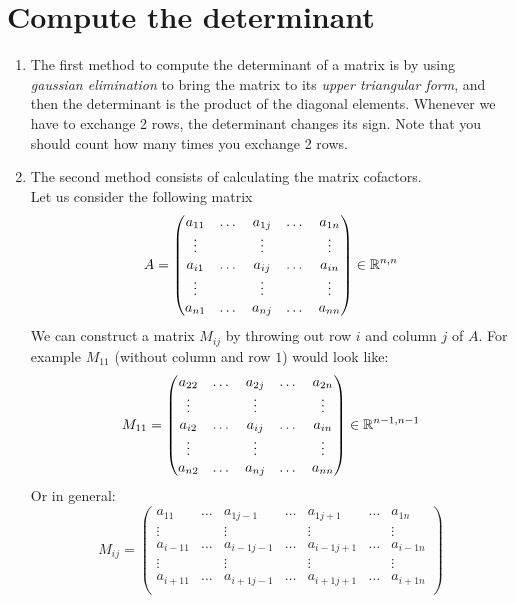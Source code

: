 \section{Compute the determinant}
\begin{enumerate}
\item The first method to compute the determinant of a matrix is by using \textit{gaussian elimination} to bring the matrix to its \textit{upper triangular form}, and then the determinant is the product of the diagonal elements. Whenever we have to exchange 2 rows, the determinant changes its sign. Note that you should count how many times you exchange 2 rows.

\item The second method consists of calculating the matrix cofactors.\\ Let us consider the following matrix
\[
A = \begin{pmatrix}
a_{11} & \dots &a_{1j} & \dots &a_{1n}\\
\vdots & {} & \vdots & {} & \vdots \\
a_{i1} & \dots &a_{ij} & \dots &a_{in}\\
\vdots & {} & \vdots & {} & \vdots \\
a_{n1} & \dots &a_{nj} & \dots &a_{nn}\\
\end{pmatrix} \in\mathbb{R}^{n,n}
\]
We can construct a matrix $M_{ij}$ by throwing out row $i$ and column $j$ of $A$. For example $M_{11}$ (without column and row $1$) would look like:
$$
M_{11} = \begin{pmatrix}
a_{22} & \dots &a_{2j} & \dots &a_{2n}\\
\vdots & {} & \vdots & {} & \vdots \\
a_{i2} & \dots &a_{ij} & \dots &a_{in}\\
\vdots & {} & \vdots & {} & \vdots \\
a_{n2} & \dots &a_{nj} & \dots &a_{nn}\\
\end{pmatrix} \in\R^{n-1, n-1}
$$
Or in general:
$$
M_{ij} = \begin{pmatrix}
a_{11} & \dots & a_{1j-1} & \dots & a_{1j+1} & \dots & a_{1n}\\
\vdots & {} & \vdots & {} & \vdots & {} & \vdots\\
a_{i-11} & \dots & a_{i-1j-1} & \dots & a_{i-1j+1} & \dots & a_{i-1n}\\
\vdots & {} & \vdots & {} & \vdots & {} & \vdots\\
a_{i+11} & \dots & a_{i+1j-1} & \dots & a_{i+1j+1} & \dots & a_{i+1n}\\

\end{pmatrix}$$
\end{enumerate}
